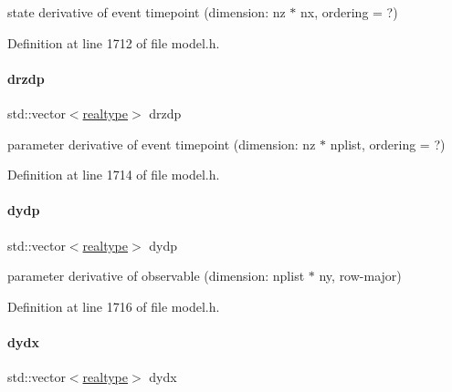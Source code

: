 state derivative of event timepoint (dimension\+: nz $\ast$ nx, ordering = ?) 

Definition at line 1712 of file model.\+h.

\mbox{\label{classamici_1_1_model_af996feb03ef94b432683ea74277cc4a8}} 
\paragraph{\texorpdfstring{drzdp}{drzdp}}
{\footnotesize\ttfamily std\+::vector$<$\mbox{\hyperlink{namespaceamici_a1bdce28051d6a53868f7ccbf5f2c14a3}{realtype}}$>$ drzdp\hspace{0.3cm}{\ttfamily [protected]}}

parameter derivative of event timepoint (dimension\+: nz $\ast$ nplist, ordering = ?) 

Definition at line 1714 of file model.\+h.

\mbox{\label{classamici_1_1_model_a19a0e6ca8882314d7dd4e8f2fcc841fd}} 
\paragraph{\texorpdfstring{dydp}{dydp}}
{\footnotesize\ttfamily std\+::vector$<$\mbox{\hyperlink{namespaceamici_a1bdce28051d6a53868f7ccbf5f2c14a3}{realtype}}$>$ dydp\hspace{0.3cm}{\ttfamily [protected]}}

parameter derivative of observable (dimension\+: nplist $\ast$ ny, row-\/major) 

Definition at line 1716 of file model.\+h.

\mbox{\label{classamici_1_1_model_ace5ccde1d7a065614717cd85fce09f9d}} 
\paragraph{\texorpdfstring{dydx}{dydx}}
{\footnotesize\ttfamily std\+::vector$<$\mbox{\hyperlink{namespaceamici_a1bdce28051d6a53868f7ccbf5f2c14a3}{realtype}}$>$ dydx\hspace{0.3cm}{\ttfamily [protected]}}

